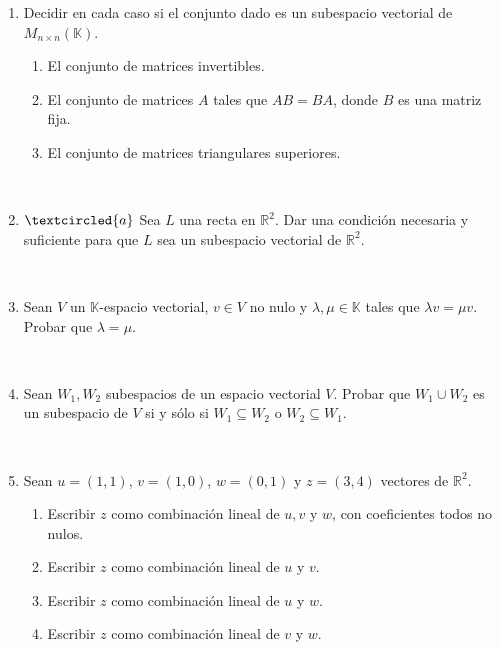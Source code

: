 \documentclass[12pt]{amsart}
\begin{document}
\begin{enumerate}
\

\item\label{sub matrices} Decidir en cada caso si el conjunto dado es un subespacio vectorial de $M_{n\times n}(\mathbb{K})$.
\begin{enumerate}
	\item\label{sub matrices invertibles} El conjunto de matrices  invertibles.
	\item\label{sub matrices AB} El conjunto de matrices $A$ tales que $AB = BA$, donde $B$ es una matriz fija.
	\item\label{sub matrices triangulares} El conjunto de matrices triangulares superiores.
\end{enumerate}

\

\item\label{rectas} $\textcircled{a}$ Sea $L$ una recta en $\mathbb{R}^2$. Dar una condici\'on necesaria y suficiente para que $L$ sea un subespacio vectorial de $\mathbb{R}^2$.

\

\item Sean $V$ un $\mathbb{K}$-espacio vectorial, $v\in V$ no nulo y $\lambda,\mu\in\mathbb{K}$ tales que $\lambda v=\mu v$. Probar que $\lambda=\mu$.

\

\item Sean $W_1, W_2$ subespacios de un espacio vectorial $V$. Probar que $W_1 \cup W_2$ es un subespacio
	de $V$ si y s\'olo si $W_1 \subseteq W_2$ o $W_2 \subseteq W_1$.
	
\

\item Sean $u=(1,1)$, $v=(1,0)$, $w=(0,1)$ y $z=(3,4)$ vectores de $\mathbb{R}^2$.
\begin{enumerate}
\item Escribir $z$ como combinaci\'on lineal de $u,v$ y $w$, con coeficientes todos no nulos.
\item Escribir $z$ como combinaci\'on lineal de $u$ y $v$.
\item Escribir $z$ como combinaci\'on lineal de $u$ y $w$.
\item Escribir $z$ como combinaci\'on lineal de $v$ y $w$.
\end{enumerate}


\end{enumerate}
\end{document}
